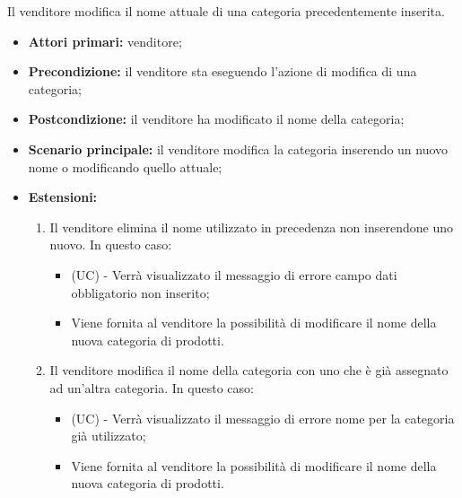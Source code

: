 Il venditore modifica il nome attuale di una categoria precedentemente inserita.
\begin{itemize}
    \item \textbf{Attori primari:} venditore;
    \item \textbf{Precondizione:} il venditore sta eseguendo l'azione di modifica di una categoria;
    \item \textbf{Postcondizione:} il venditore ha modificato il nome della categoria;
    \item \textbf{Scenario principale:} il venditore modifica la categoria inserendo un nuovo nome o modificando quello attuale;
    \item \textbf{Estensioni:}
    \begin{enumerate}[label=\lett]
    	\item Il venditore elimina il nome utilizzato in precedenza non inserendone uno nuovo. In questo caso:
    	\begin{itemize}
    		\item (UC) - Verrà visualizzato il messaggio di errore campo dati obbligatorio non inserito;
    		\item Viene fornita al venditore la possibilità di modificare il nome della nuova categoria di prodotti.
    	\end{itemize}
    	\item Il venditore modifica il nome della categoria con uno che è già assegnato ad un'altra categoria. In questo caso:
		\begin{itemize}
			\item (UC) - Verrà visualizzato il messaggio di errore nome per la categoria già utilizzato;
			\item Viene fornita al venditore la possibilità di modificare il nome della nuova categoria di prodotti.
		\end{itemize}
    \end{enumerate}
\end{itemize}

